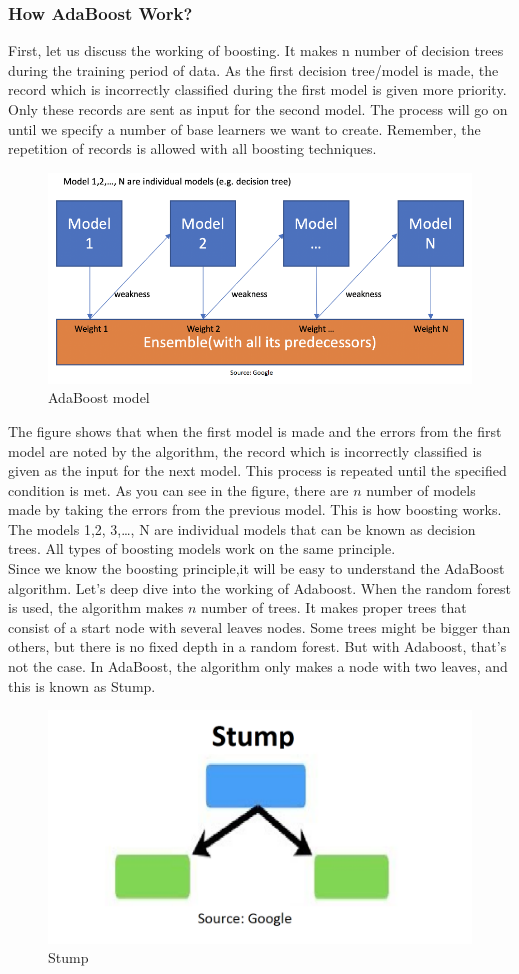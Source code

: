         \subsubsection{How AdaBoost Work?}
        First, let us discuss the working of boosting. It makes n number of decision trees during the training period of data. As the first decision tree/model is made, the record which is incorrectly classified during the first model is given more priority. Only these 
        records are sent as input for the second model. The process will go on until we specify a number of base learners we want to create. Remember, the repetition of records is allowed with all boosting techniques.
        \begin{figure}[H]
            \centering
            \includegraphics[width=0.6\linewidth]{img/adaboost.png}
            \caption{AdaBoost model}
        \end{figure}
        The figure shows that when the first model is made and the errors from the first model are noted by the algorithm, the record which is incorrectly classified is given as the input for the next model. This process is repeated until the specified condition is met. 
        As you can see in the figure, there are $n$ number of models made by taking the errors from the previous model. This is how boosting works. The models 1,2, 3,…, N are individual models that can be known as decision trees. All types of boosting models work on the same principle. \\ 
        \vspace{3mm}
        Since we know the boosting principle,it will be easy to understand the AdaBoost algorithm. Let’s deep dive into the working of Adaboost. When the random forest is used, the algorithm makes $n$ number of trees. It makes proper trees that consist of a start node with several leaves nodes. 
        Some trees might be bigger than others, but there is no fixed depth in a random forest. But with Adaboost, that’s not the case. In AdaBoost, the algorithm only makes a node with two leaves, and this is known as Stump. 
        \begin{figure}[H]
            \centering
            \includegraphics[width=0.6\linewidth]{img/stump.png}
            \caption{Stump}
        \end{figure}
